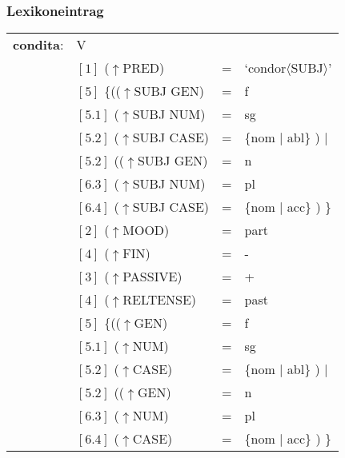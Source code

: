 \documentclass[12pt,a4paper]{article}
\begin{document}
\subsubsection{Lexikoneintrag}

\begin{singlespace}
\begin{tabular}{ l  l  l  l  } 
\textbf{condita}: & V \\
$\qquad$ & $[1]$ \:  ($\uparrow$PRED) & = & `condor$\langle$SUBJ$\rangle$'\\
$\qquad$ & $[5]$ \:  \{(($\uparrow$SUBJ GEN) & = & f \\ 
$\qquad$ & $[5.1]$ \:  ($\uparrow$SUBJ NUM) & = & sg \\
$\qquad$ & $[5.2]$ \:  ($\uparrow$SUBJ CASE) & = & \{nom $\mid$ abl\} ) $\mid$\\
$\qquad$ & $[5.2]$ \: (($\uparrow$SUBJ GEN) & = & n \\
$\qquad$ & $[6.3]$ \:  ($\uparrow$SUBJ NUM) & = & pl \\
$\qquad$ & $[6.4]$ \:  ($\uparrow$SUBJ CASE) & = & \{nom $\mid$ acc\} ) \}\\
$\qquad$ & $[2]$ \:  ($\uparrow$MOOD) & = & part\\
$\qquad$ & $[4]$ \:  ($\uparrow$FIN) & = & - \\
$\qquad$ & $[3]$ \:  ($\uparrow$PASSIVE) & = & + \\
$\qquad$ & $[4]$ \:  ($\uparrow$RELTENSE) & = & past \\
$\qquad$ & $[5]$ \:  \{(($\uparrow$GEN) & = & f \\ 
$\qquad$ & $[5.1]$ \:  ($\uparrow$NUM) & = & sg \\
$\qquad$ & $[5.2]$ \:  ($\uparrow$CASE) & = & \{nom $\mid$ abl\} ) $\mid$\\
$\qquad$ & $[5.2]$ \: (($\uparrow$GEN) & = & n \\
$\qquad$ & $[6.3]$ \:  ($\uparrow$NUM) & = & pl \\
$\qquad$ & $[6.4]$ \:  ($\uparrow$CASE) & = & \{nom $\mid$ acc\} ) \}\\
\end{tabular}
\newline
\end{singlespace}
\end{document}
